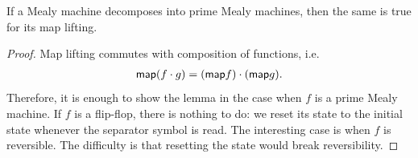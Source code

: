 \begin{lemma}\label{lem:map-lifting-decomposition-mealy}
    If a Mealy machine decomposes into prime Mealy machines, then the same is true for its map lifting.
\end{lemma}
\begin{proof}
    Map lifting commutes with composition of functions, i.e.
    \begin{align*}
    \mathsf{map}(f \cdot g) = (\mathsf{map} f) \cdot (\mathsf{map} g).
    \end{align*}
    Therefore, it is enough to show the lemma in the case when $f$ is a prime Mealy machine. If $f$ is a flip-flop, there is nothing to do:  we reset its state to the initial state whenever the separator symbol is read. The interesting case is when $f$ is reversible. The difficulty is that resetting the state would break reversibility. 


\end{proof}
